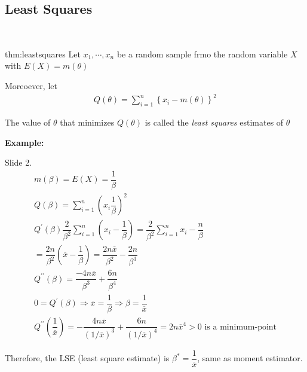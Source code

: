 \subsection{Least Squares}\hfill\\\par
\begin{theo}{thm:leastsquares}
  Let $x_1,\cdots,x_n$ be a random sample frmo the random variable $X$ with $E(X) = m(\theta)$\par
  \noindent Moreoever, let
  \begin{equation*}
    \begin{gathered}
      Q(\theta) = \sum_{i=1}^{n}\left\{x_i-m(\theta)\right\}^2
    \end{gathered}
  \end{equation*}
  \par\bigskip
  \noindent The value of $\theta$ that minimizes $Q(\theta)$ is called the \textit{least squares} estimates of $\theta$
\end{theo}
\par\bigskip
\noindent\textbf{Example:}\par
Slide 2. 
\begin{equation*}
  \begin{gathered}
    m(\beta) = E(X) = \dfrac{1}{\beta}\\
    Q(\beta) = \sum_{i=1}^{n}(x_i\dfrac{1}{\beta})^2\\
    Q^{\prime}(\beta) \dfrac{2}{\beta^2}\sum_{i=1}^{n}(x_i-\dfrac{1}{\beta}) = \dfrac{2}{\beta^2}\sum_{i=1}^{n}x_i - \dfrac{n}{\beta}\\
    = \dfrac{2n}{\beta^2}(\overline{x}-\dfrac{1}{\beta}) = \dfrac{2n\overline{x}}{\beta^2}-\dfrac{2n}{\beta^3}\\
    Q^{\prime\prime}(\beta) = \dfrac{-4n\overline{x}}{\beta^3}+\dfrac{6n}{\beta^4}\\
    0 = Q^{\prime}(\beta)\Rightarrow \overline{x} = \dfrac{1}{\beta} \Rightarrow\beta = \dfrac{1}{\overline{x}}\\
    Q^{\prime\prime}\left(\dfrac{1}{\overline{x}}\right) = -\dfrac{4n\overline{x}}{(1/\overline{x})^3}+\dfrac{6n}{(1/\overline{x})^4} = 2n\overline{x}^4>0\text{ is a minimum-point}
  \end{gathered}
\end{equation*}\par
\noindent Therefore, the LSE (least square estimate) is $\beta^* = \dfrac{1}{\overline{x}}$, same as moment estimator.
\par\bigskip
